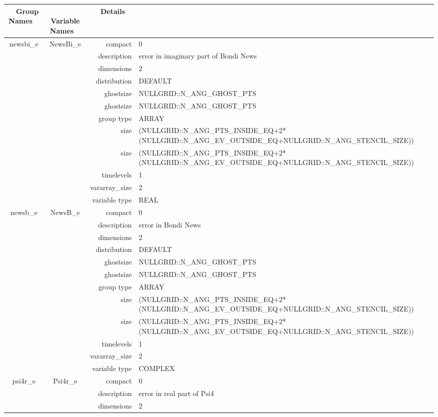 \begin{tabular*}{150mm}{|c|c@{\extracolsep{\fill}}|rl|} \hline 
~ {\bf Group Names} ~ & ~ {\bf Variable Names} ~  &{\bf Details} ~ & ~ \\ 
\hline 
newsbi\_e & NewsBi\_e & compact & 0 \\ 
 &  & description & error in imaginary part of Bondi News \\ 
 &  & dimensions & 2 \\ 
 &  & distribution & DEFAULT \\ 
 &  & ghostsize & NULLGRID::N\_ANG\_GHOST\_PTS \\ 
& ~ & ghostsize & NULLGRID::N\_ANG\_GHOST\_PTS \\ 
 &  & group type & ARRAY \\ 
 &  & size & (NULLGRID::N\_ANG\_PTS\_INSIDE\_EQ+2*(NULLGRID::N\_ANG\_EV\_OUTSIDE\_EQ+NULLGRID::N\_ANG\_STENCIL\_SIZE)) \\ 
& ~ & size & (NULLGRID::N\_ANG\_PTS\_INSIDE\_EQ+2*(NULLGRID::N\_ANG\_EV\_OUTSIDE\_EQ+NULLGRID::N\_ANG\_STENCIL\_SIZE)) \\ 
 &  & timelevels & 1 \\ 
 &  & vararray\_size & 2 \\ 
 &  & variable type & REAL \\ 
\hline 
newsb\_e & NewsB\_e & compact & 0 \\ 
 &  & description & error in Bondi News \\ 
 &  & dimensions & 2 \\ 
 &  & distribution & DEFAULT \\ 
 &  & ghostsize & NULLGRID::N\_ANG\_GHOST\_PTS \\ 
& ~ & ghostsize & NULLGRID::N\_ANG\_GHOST\_PTS \\ 
 &  & group type & ARRAY \\ 
 &  & size & (NULLGRID::N\_ANG\_PTS\_INSIDE\_EQ+2*(NULLGRID::N\_ANG\_EV\_OUTSIDE\_EQ+NULLGRID::N\_ANG\_STENCIL\_SIZE)) \\ 
& ~ & size & (NULLGRID::N\_ANG\_PTS\_INSIDE\_EQ+2*(NULLGRID::N\_ANG\_EV\_OUTSIDE\_EQ+NULLGRID::N\_ANG\_STENCIL\_SIZE)) \\ 
 &  & timelevels & 1 \\ 
 &  & vararray\_size & 2 \\ 
 &  & variable type & COMPLEX \\ 
\hline 
psi4r\_e & Psi4r\_e & compact & 0 \\ 
 &  & description & error in real part of Psi4 \\ 
 &  & dimensions & 2 \\ 

\end{tabular*}
